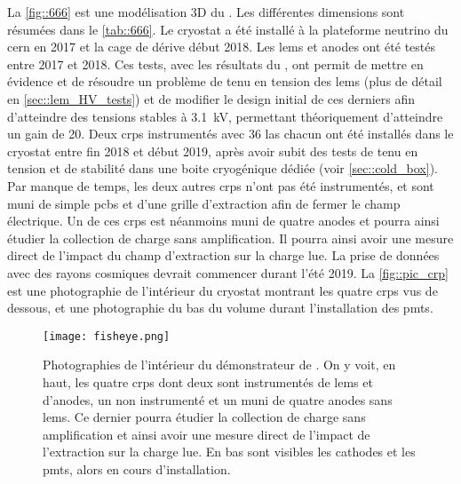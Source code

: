       La \autoref{fig::666} est une modélisation 3D du \SSS{}. Les différentes dimensions sont résumées dans le \autoref{tab::666}. Le cryostat a été installé à la plateforme neutrino du \gls{cern} en 2017 et la cage de dérive début 2018. Les \glspl{lem} et anodes ont été testés entre 2017 et 2018. Ces tests, avec les résultats du \TOO{}, ont permit de mettre en évidence et de résoudre un problème de tenu en tension des \glspl{lem} (plus de détail en \autoref{sec::lem_HV_tests}) et de modifier le design initial de ces derniers afin d'atteindre des tensions stables à \SI{3.1}{\kilo\volt}, permettant théoriquement d'atteindre un gain de 20. Deux \glspl{crp} instrumentés avec 36 \gls{las} chacun ont été installés dans le cryostat entre fin 2018 et début 2019, après avoir subit des tests de tenu en tension et de stabilité dans une boite cryogénique dédiée (voir \autoref{sec::cold_box}). Par manque de temps, les deux autres \glspl{crp} n'ont pas été instrumentés, et sont muni de simple \glspl{pcb} et d'une grille d'extraction afin de fermer le champ électrique. Un de ces \glspl{crp} est néanmoins muni de quatre anodes et pourra ainsi étudier la collection de charge sans amplification. Il pourra ainsi avoir une mesure direct de l'impact du champ d'extraction sur la charge lue. La prise de données avec des rayons cosmiques devrait commencer durant l'été 2019. La \autoref{fig::pic_crp} est une photographie de l'intérieur du cryostat montrant les quatre \glspl{crp} vus de dessous, et une photographie du bas du volume durant l'installation des \glspl{pmt}.

      \begin{figure}[htbp]
        \begin{center}\texttt{[image: fisheye.png]}\end{center}
        \caption[Schéma du démonstrateur de \SSS{}.]{\label{fig::pic_crp}Photographies de l'intérieur du démonstrateur de \SSS{}. On y voit, en haut, les quatre \glspl{crp} dont deux sont instrumentés de \glspl{lem} et d'anodes, un non instrumenté et un muni de quatre anodes sans \glspl{lem}. Ce dernier pourra étudier la collection de charge sans amplification et ainsi avoir une mesure direct de l'impact de l'extraction sur la charge lue. En bas sont visibles les cathodes et les \glspl{pmt}, alors en cours d'installation.}
      \end{figure}

\FloatBarrier

\printbibliography
